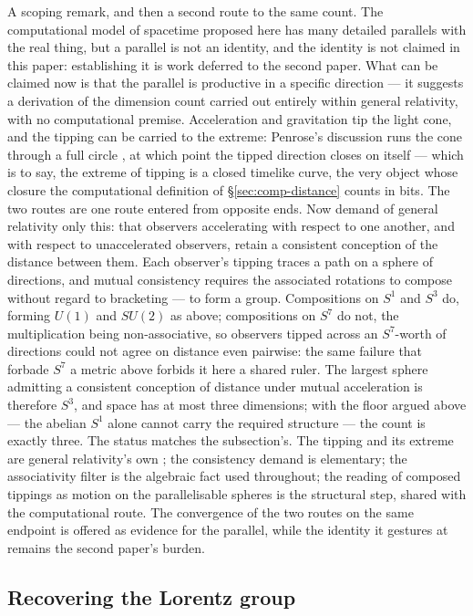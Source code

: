 A scoping remark, and then a second route to the same count. The computational model of spacetime
proposed here has many detailed parallels with the real thing, but a parallel is not an identity,
and the identity is not claimed in this paper: establishing it is work deferred to the second paper.
What can be claimed now is that the parallel is productive in a specific direction --- it suggests a
derivation of the dimension count carried out entirely within general relativity, with no
computational premise. Acceleration and gravitation tip the light cone, and the tipping can be
carried to the extreme: Penrose's discussion runs the cone through a full circle
\autocite[382]{Penrose1994}, at which point the tipped direction closes on itself --- which is to
say, the extreme of tipping is a closed timelike curve, the very object whose closure the
computational definition of \S\ref{sec:comp-distance} counts in bits. The two routes are one route
entered from opposite ends. Now demand of general relativity only this: that observers accelerating
with respect to one another, and with respect to unaccelerated observers, retain a consistent
conception of the distance between them. Each observer's tipping traces a path on a sphere of
directions, and mutual consistency requires the associated rotations to compose without regard to
bracketing --- to form a group. Compositions on $S^{1}$ and $S^{3}$ do, forming $U(1)$ and $SU(2)$ as above; compositions on
$S^{7}$ do not, the multiplication being non-associative, so observers tipped across an
$S^{7}$-worth of directions could not agree on distance even pairwise: the same failure that forbade
$S^{7}$ a metric above forbids it here a shared ruler. The largest sphere admitting a consistent
conception of distance under mutual acceleration is therefore $S^{3}$, and space has at most three
dimensions; with the floor argued above --- the abelian $S^{1}$ alone cannot carry the required
structure --- the count is exactly three. The status matches the subsection's. The tipping and its
extreme are general relativity's own \autocite{Penrose1994}; the consistency demand is
elementary; the associativity filter is the algebraic fact used throughout; the reading of composed
tippings as motion on the parallelisable spheres is the structural step, shared with the
computational route. The convergence of the two routes on the same endpoint is offered as evidence
for the parallel, while the identity it gestures at remains the second paper's burden.

\subsection{Recovering the Lorentz group}
\label{sec:lorentz}

